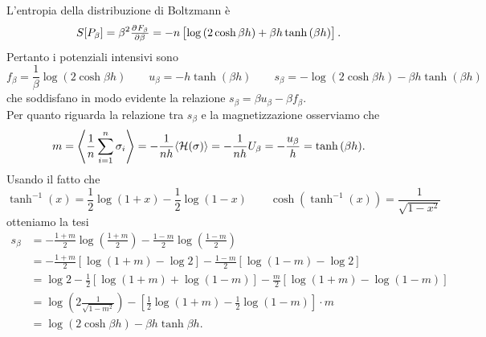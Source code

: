 \begin{solution}
\[    \]
    L'entropia della distribuzione di Boltzmann è
    \[
        S[P_\beta] = \beta^2 \pd{F_\beta}{\beta} = -n \left[\log{(2 \cosh{\beta h})} + \beta h \tanh{(\beta h)}\right].
    \]
    Pertanto i potenziali intensivi sono
    \[
        f_\beta = \frac{1}{\beta} \log(2\cosh{\beta h}) \qquad u_\beta =  -h \tanh{(\beta h)} \qquad s_\beta = -\log{(2 \cosh{\beta h})} - \beta h \tanh{(\beta h)}
    \]
    che soddisfano in modo evidente la relazione $ s_\beta = \beta u_\beta - \beta f_\beta $. \\
    Per quanto riguarda la relazione tra $ s_\beta $ e la magnetizzazione osserviamo che
    \[
        m = \left\langle \frac{1}{n} \sum_{i=1}^{n} \sigma_i \right\rangle = -\frac{1}{nh} \langle \mathcal{H}(\sigma)\rangle = -\frac{1}{nh} U_\beta = - \frac{u_\beta}{h} = \tanh{(\beta h)}.
    \]
    Usando il fatto che
    \[
        \tanh^{-1}(x) = \frac{1}{2} \log(1+x) - \frac{1}{2} \log(1-x) \qquad \cosh(\tanh^{-1}(x)) = \frac{1}{\sqrt{1 - x^2}}
    \]
    otteniamo la tesi
    \begin{align*}
        s_\beta & = -\frac{1+m}{2}\log{\left(\frac{1+m}{2}\right)} -\frac{1-m}{2}\log{\left(\frac{1-m}{2}\right)} \\
        & = -\frac{1+m}{2}\left[\log{(1+m)} - \log{2}\right] -\frac{1-m}{2}\left[\log{(1-m)} - \log{2}\right] \\
        & = \log{2} - \frac{1}{2}\left[\log{(1+m)} + \log{(1-m)}\right] - \frac{m}{2}\left[\log{(1+m)} - \log{(1-m)}\right] \\
        & = \log{\left(2 \frac{1}{\sqrt{1-m^2}}\right)} - \left[\frac{1}{2}\log{(1+m)} - \frac{1}{2}\log{(1-m)}\right] \cdot m \\
        & = \log{\left(2 \cosh{\beta h}\right)} - \beta h \tanh{\beta h}.
    \end{align*}
\end{solution}
